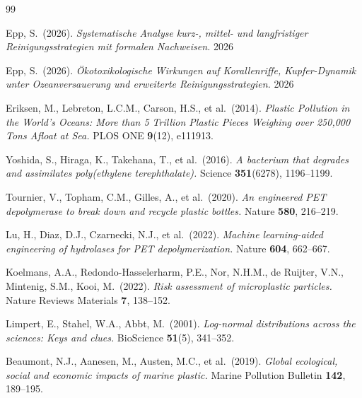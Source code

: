 ﻿\documentclass[12pt,a4paper]{article}
\theoremstyle{definition}
\theoremstyle{remark}
\begin{document}
\begin{thebibliography}{99}

Epp, S.\ (2026).
\textit{Systematische Analyse kurz-, mittel- und langfristiger
Reinigungsstrategien mit formalen Nachweisen.} 2026

Epp, S.\ (2026).
\textit{Ökotoxikologische Wirkungen auf Korallenriffe, Kupfer-Dynamik unter
Ozeanversauerung und erweiterte Reinigungsstrategien.} 2026

Eriksen, M., Lebreton, L.C.M., Carson, H.S., et al.\ (2014).
\textit{Plastic Pollution in the World's Oceans: More than 5 Trillion Plastic
Pieces Weighing over 250,000 Tons Afloat at Sea.}
PLOS ONE \textbf{9}(12), e111913.

Yoshida, S., Hiraga, K., Takehana, T., et al.\ (2016).
\textit{A bacterium that degrades and assimilates poly(ethylene terephthalate).}
Science \textbf{351}(6278), 1196--1199.

Tournier, V., Topham, C.M., Gilles, A., et al.\ (2020).
\textit{An engineered PET depolymerase to break down and recycle
plastic bottles.}
Nature \textbf{580}, 216--219.

Lu, H., Diaz, D.J., Czarnecki, N.J., et al.\ (2022).
\textit{Machine learning-aided engineering of hydrolases for
PET depolymerization.}
Nature \textbf{604}, 662--667.

Koelmans, A.A., Redondo-Hasselerharm, P.E., Nor, N.H.M.,
de Ruijter, V.N., Mintenig, S.M., Kooi, M.\ (2022).
\textit{Risk assessment of microplastic particles.}
Nature Reviews Materials \textbf{7}, 138--152.

Limpert, E., Stahel, W.A., Abbt, M.\ (2001).
\textit{Log-normal distributions across the sciences: Keys and clues.}
BioScience \textbf{51}(5), 341--352.

Beaumont, N.J., Aanesen, M., Austen, M.C., et al.\ (2019).
\textit{Global ecological, social and economic impacts of marine plastic.}
Marine Pollution Bulletin \textbf{142}, 189--195.


\end{thebibliography}
\end{document}

